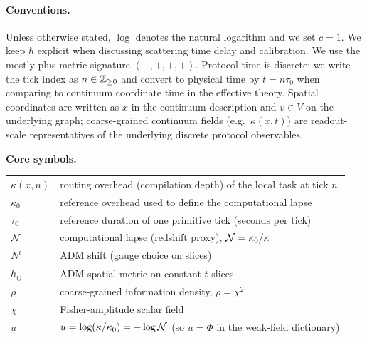 \paragraph{Conventions.}
Unless otherwise stated, $\log$ denotes the natural logarithm and we set $c=1$.
We keep $\hbar$ explicit when discussing scattering time delay and calibration.
We use the mostly-plus metric signature $(-,+,+,+)$.
Protocol time is discrete: we write the tick index as $n\in\mathbb{Z}_{\ge 0}$ and convert to physical time by $t=n\tau_0$ when comparing to continuum coordinate time in the effective theory.
Spatial coordinates are written as $x$ in the continuum description and $v\in V$ on the underlying graph; coarse-grained continuum fields (e.g.\ $\kappa(x,t)$) are readout-scale representatives of the underlying discrete protocol observables.
\par
\noindent\textbf{Core symbols.}
\begin{center}
\begin{tabular}{@{}l l@{}}
$\kappa(x,n)$ & routing overhead (compilation depth) of the local task at tick $n$ \\
$\kappa_0$ & reference overhead used to define the computational lapse \\
$\tau_0$ & reference duration of one primitive tick (seconds per tick) \\
$\mathcal{N}$ & computational lapse (redshift proxy), $\mathcal{N}=\kappa_0/\kappa$ \\
$N^i$ & ADM shift (gauge choice on slices) \\
$h_{ij}$ & ADM spatial metric on constant-$t$ slices \\
$\rho$ & coarse-grained information density, $\rho=\chi^2$ \\
$\chi$ & Fisher-amplitude scalar field \\
$u$ & $u=\log(\kappa/\kappa_0)=-\log\mathcal{N}$ (so $u=\Phi$ in the weak-field dictionary) \\
\end{tabular}
\end{center}

\tableofcontents
\newpage


